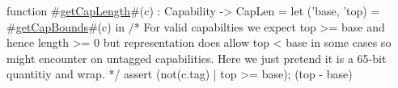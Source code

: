 function #\hyperref[sailMIPSzgetCapLength]{getCapLength}#(c) : Capability -> CapLen =
    let ('base, 'top) = #\hyperref[sailMIPSzgetCapBounds]{getCapBounds}#(c) in {
        /* For valid capabilties we expect top >= base and hence
           length >= 0 but representation does allow top < base in some
           cases so might encounter on untagged capabilities. Here we just
           pretend it is a 65-bit quantitiy and wrap. */
        assert (not(c.tag) | top >= base);
        (top - base) %
    }
